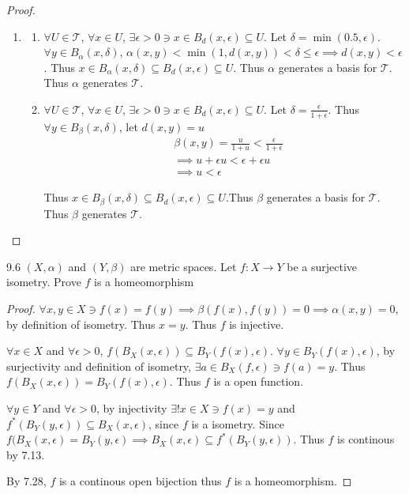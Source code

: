 \documentclass{article}
\newcommand*{\T}{\mathcal{T}}
\newcommand*{\subeq}{\subseteq}
\begin{document}
\begin{proof}
\begin{enumerate}
        \item \begin{enumerate}
            \item $\forall U \in \T$, $\forall x \in U$, $\exists \epsilon > 0 \ni x \in B_d(x, \epsilon) \subeq U$. Let $\delta = \min(0.5, \epsilon)$. $\forall y \in B_{\alpha}(x, \delta)$, $\alpha(x,y) < \min(1, d(x, y)) < \delta \leq \epsilon \implies d(x, y) < \epsilon$. Thus $x \in B_{\alpha}(x, \delta)\subeq B_{d}(x, \epsilon) \subeq U$. Thus $\alpha$ generates a basis for $\T$. Thus $\alpha$ generates $\T$. 
            \item $\forall U \in \T$, $\forall x \in U$, $\exists \epsilon > 0 \ni x \in B_d(x, \epsilon) \subeq U$. Let $\delta = \frac{\epsilon}{1 + \epsilon}$. Thus $\forall y \in B_\beta(x, \delta)$, let $d(x, y) = u$ 
            \begin{align*}
                &\beta(x, y) = \frac{u}{1 + u} < \frac{\epsilon}{1 + \epsilon} \\
                &\implies u + \epsilon u < \epsilon + \epsilon u \\
                &\implies u < \epsilon
            \end{align*}

            Thus $x \in B_{\beta}(x, \delta) \subeq B_{d}(x, \epsilon) \subeq U$.Thus $\beta$ generates a basis for $\T$. Thus $\beta$ generates $\T$.    
        \end{enumerate}
    \end{enumerate}    
\end{proof}

\bigskip

\begin{claim}{9.6}\label{Claim 8.6.}
    $(X, \alpha)$ and $(Y, \beta)$ are metric spaces. Let $f: X \to Y$ be a surjective isometry. Prove $f$ is a homeomorphism  
\end{claim}
\begin{proof}
    $\forall x, y \in X \ni f(x) = f(y) \implies \beta(f(x), f(y)) = 0 \implies \alpha(x, y) = 0$, by definition of isometry. Thus $x = y$. Thus $f$ is injective. 
    
    $\forall x \in X$ and $\forall \epsilon > 0$, $f(B_{X}(x, \epsilon)) \subeq B_{Y}(f(x), \epsilon)$. $\forall y \in B_{Y}(f(x), \epsilon)$, by surjectivity and definition of isometry, $\exists a \in B_{X}(f, \epsilon) \ni f(a) = y$. Thus $f(B_{X}(x, \epsilon)) = B_{Y}(f(x), \epsilon)$. Thus $f$ is a open function. 
    
    $\forall y \in Y$ and $\forall \epsilon > 0$, by injectivity $\exists! x \in X \ni f(x) = y$ and $f^*(B_Y(y, \epsilon)) \subeq B_X(x, \epsilon)$, since $f$ is a isometry. Since $f(B_X(x, \epsilon) = B_Y(y, \epsilon)\implies B_X(x, \epsilon) \subeq f^*(B_Y(y, \epsilon))$. Thus $f$ is continous by 7.13.
    
    By 7.28, $f$ is a continous open bijection thus $f$ is a homeomorphism.  
\end{proof}
\end{document}
